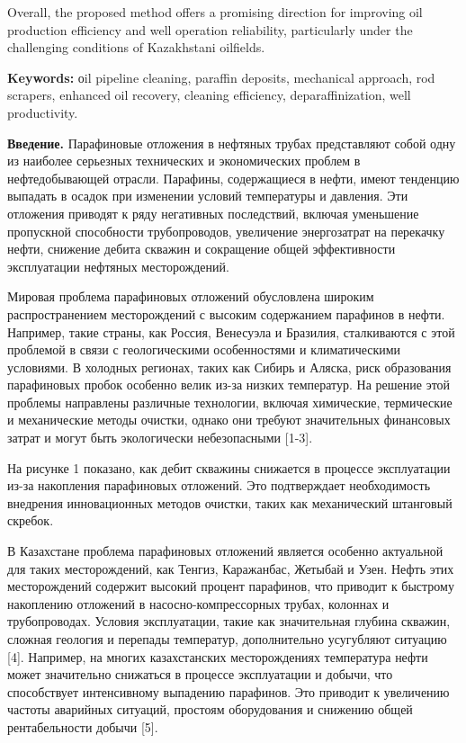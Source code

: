 Overall, the proposed method offers a promising direction for improving
oil production efficiency and well operation reliability, particularly
under the challenging conditions of Kazakhstani oilfields.

{\bfseries Keywords:} оil pipeline cleaning, paraffin deposits, mechanical
approach, rod scrapers, enhanced oil recovery, cleaning efficiency,
deparaffinization, well productivity.

\begin{multicols}{2}
{\bfseries Введение.} Парафиновые отложения в нефтяных трубах представляют
собой одну из наиболее серьезных технических и экономических проблем в
нефтедобывающей отрасли. Парафины, содержащиеся в нефти, имеют тенденцию
выпадать в осадок при изменении условий температуры и давления. Эти
отложения приводят к ряду негативных последствий, включая уменьшение
пропускной способности трубопроводов, увеличение энергозатрат на
перекачку нефти, снижение дебита скважин и сокращение общей
эффективности эксплуатации нефтяных месторождений.

Мировая проблема парафиновых отложений обусловлена широким
распространением месторождений с высоким содержанием парафинов в нефти.
Например, такие страны, как Россия, Венесуэла и Бразилия, сталкиваются с
этой проблемой в связи с геологическими особенностями и климатическими
условиями. В холодных регионах, таких как Сибирь и Аляска, риск
образования парафиновых пробок особенно велик из-за низких температур.
На решение этой проблемы направлены различные технологии, включая
химические, термические и механические методы очистки, однако они
требуют значительных финансовых затрат и могут быть экологически
небезопасными {[}1-3{]}.

На рисунке 1 показано, как дебит скважины снижается в процессе
эксплуатации из-за накопления парафиновых отложений. Это подтверждает
необходимость внедрения инновационных методов очистки, таких как
механический штанговый скребок.

В Казахстане проблема парафиновых отложений является особенно актуальной
для таких месторождений, как Тенгиз, Каражанбас, Жетыбай и Узен. Нефть
этих месторождений содержит высокий процент парафинов, что приводит к
быстрому накоплению отложений в насосно-компрессорных трубах, колоннах и
трубопроводах. Условия эксплуатации, такие как значительная глубина
скважин, сложная геология и перепады температур, дополнительно
усугубляют ситуацию {[}4{]}. Например, на многих казахстанских
месторождениях температура нефти может значительно снижаться в процессе
эксплуатации и добычи, что способствует интенсивному выпадению
парафинов. Это приводит к увеличению частоты аварийных ситуаций,
простоям оборудования и снижению общей рентабельности добычи {[}5{]}.
\end{multicols}

